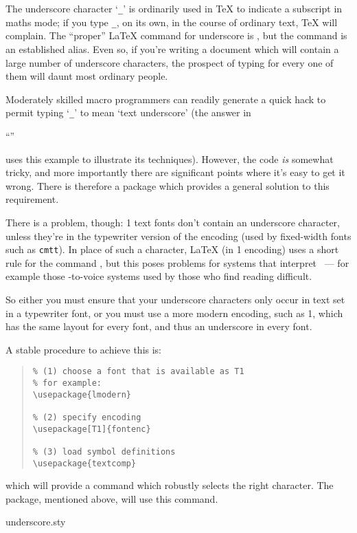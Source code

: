 
The underscore character `\texttt{\_}' is ordinarily used in \TeX{} to
indicate a subscript in maths mode; if you type \texttt{\_}, on its
own, in the course of ordinary text, \TeX{} will complain.  The
``proper'' \LaTeX{} command for underscore is ,
but the \latexo{} command \csx{\_} is an established alias.  Even so,
if you're writing a document which will contain a large number of
underscore characters, the prospect of typing \csx{\_} for every one
of them will daunt most ordinary people.

Moderately skilled macro programmers can readily generate a quick hack
to permit typing `\texttt{\_}' to mean `text underscore' (the answer in
\begin{hyperversion}
  ``''
\end{hyperversion}
\begin{flatversion}
\end{flatversion}
uses this example to illustrate its techniques).
However, the code \emph{is} somewhat tricky, and more importantly
there are significant points where it's easy to get it wrong.  There
is therefore a package  which provides a general
solution to this requirement.

There is a problem, though: 1 text fonts don't contain an
underscore character, unless they're in the typewriter version of the
encoding (used by fixed-width fonts such as \texttt{cmtt}).  In place
of such a character, \LaTeX{} (in 1 encoding) uses a short rule
for the command , but this poses problems
for systems that interpret ~--- for example those
-to-voice systems used by those who find reading difficult.

So either you must ensure that your underscore characters only occur
in text set in a typewriter font, or you must use a more modern
encoding, such as 1, which has the same layout for every font,
and thus an underscore in every font.

A stable procedure to achieve this is:
\begin{quote}
\begin{verbatim}
% (1) choose a font that is available as T1
% for example:
\usepackage{lmodern}

% (2) specify encoding
\usepackage[T1]{fontenc}

% (3) load symbol definitions
\usepackage{textcomp}
\end{verbatim}
\end{quote}
which will provide a command  which robustly
selects the right character.  The  package,
mentioned above, will use this command.
\begin{ctanrefs}
\item[underscore.sty]
\end{ctanrefs}

